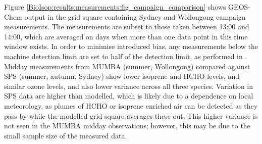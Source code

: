     
    
    Figure \ref{BioIsop:results:measurements:fig_campaign_comparison} shows GEOS-Chem output in the grid square containing Sydney and Wollongong campaign measurements.
    The measurements are subset to those taken between 13:00 and 14:00, which are averaged on days when more than one data point in this time window exists.
    In order to minimise introduced bias, any measurements below the machine detection limit are set to half of the detection limit, as performed in \textcite{Lawson2015}. 
    Midday measurements from MUMBA (summer, Wollongong) compared against SPS (summer, autumn, Sydney) show lower isoprene and HCHO levels, and similar ozone levels, and also lower variance across all three species.
    Variation in SPS data are higher than modelled, which is likely due to a dependence on local meteorology, as plumes of HCHO or isoprene enriched air can be detected as they pass by while the modelled grid square averages these out.
    This higher variance is not seen in the MUMBA midday observations; however, this may be due to the small sample size of the measured data.
    
    
    
    
    
